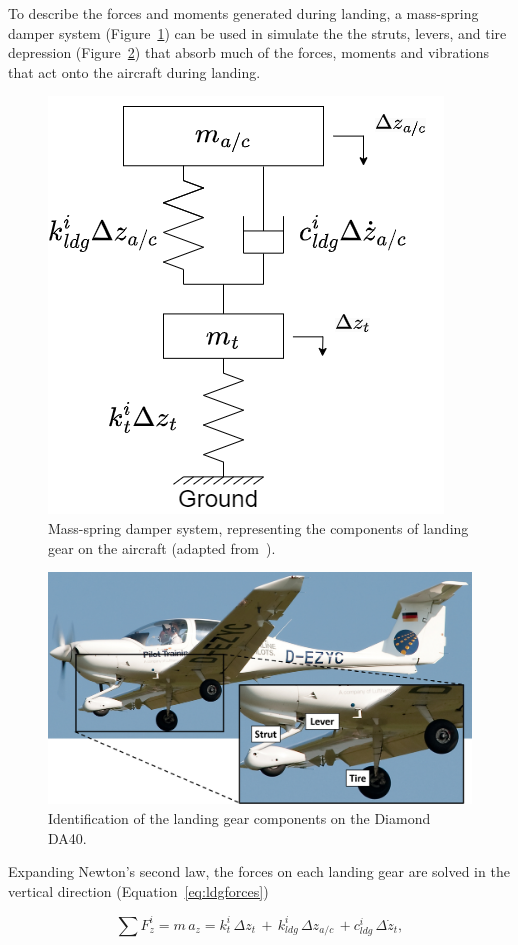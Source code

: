 \documentclass[12pt]{report}
\begin{document}
To describe the forces and moments generated during landing, a mass-spring damper system (Figure~\ref{fig:ldgfbd}) can be used in simulate the the struts, levers, and tire depression (Figure~\ref{fig:ldg}) that absorb much of the forces, moments and vibrations that act onto the aircraft during landing.

\begin{figure}[!ht]\label{fig:ldgfbd}
  \centering
  \includegraphics[width=.4\linewidth]{Figures/ldgfbd.drawio.png}
  \caption{Mass-spring damper system, representing the components of landing gear on the aircraft (adapted from~\cite{xingStrengthAnalysisDiagonal2012}).}
\end{figure}

\begin{figure}[!ht]\label{fig:ldg}
  \centering
  \includegraphics[width=.75\linewidth]{Figures/LandingGear.png}
  \caption{Identification of the landing gear components on the Diamond DA40.}
\end{figure}

Expanding Newton's second law, the forces on each landing gear are solved in the vertical direction (Equation~\ref{eq:ldgforces})

\begin{equation}
  \sum F^i_z = m\,a_z = k^i_t\, \Delta z_t\, + \, k^i_{ldg}\, \Delta z_{a/c}\, + c^i_{ldg}\, \Delta \dot{z}_t,
  \label{eq:ldgforces}
\end{equation}
\end{document}
